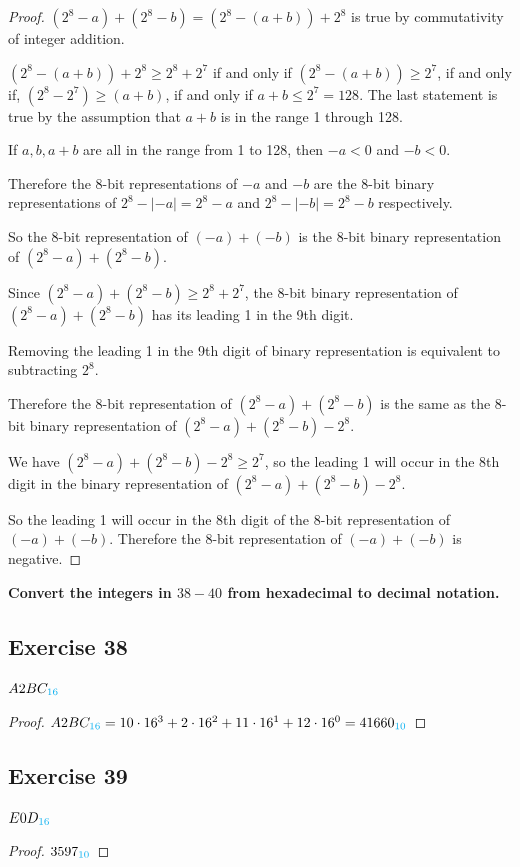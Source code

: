 \documentclass[14pt]{extarticle}
\newcommand{\base}[1]{{\color{cyan}#1}} \newcommand{\da}{\downarrow}
\begin{document}
\begin{proof} $(2^8 - a) + (2^8 - b) = (2^8 - (a + b)) + 2^8$ is true by
commutativity of integer addition.

$(2^8 - (a + b)) + 2^8 \geq 2^8 + 2^7$ if and only if $(2^8 - (a + b)) \geq
2^7$, if and only if, $(2^8 - 2^7) \geq (a + b)$, if and only if $a + b \leq 2^7
= 128$. The last statement is true by the assumption that $a+b$ is in the range
1 through 128.

If $a, b, a+b$ are all in the range from 1 to 128, then $-a < 0$ and $-b < 0$. 

Therefore the 8-bit representations of $-a$ and $-b$ are the 8-bit binary
representations of $2^8 - |-a| = 2^8 - a$ and $2^8 - |-b| = 2^8 - b$
respectively.

So the 8-bit representation of $(-a) + (-b)$ is the 8-bit binary representation
of $(2^8 - a) + (2^8 - b)$.

Since $(2^8 - a) + (2^8 - b) \geq 2^8 + 2^7$, the 8-bit binary representation of
$(2^8 - a) + (2^8 - b)$ has its leading 1 in the 9th digit.

Removing the leading 1 in the 9th digit of binary representation is equivalent
to subtracting $2^8$.

Therefore the 8-bit representation of $(2^8 - a) + (2^8 - b)$ is the same as the
8-bit binary representation of $(2^8 - a) + (2^8 - b) - 2^8$.

We have $(2^8 - a) + (2^8 - b) - 2^8 \geq 2^7$, so the leading 1 will occur in
the 8th digit in the binary representation of $(2^8 - a) + (2^8 - b) - 2^8$.

So the leading 1 will occur in the 8th digit of the 8-bit representation of
$(-a) + (-b)$. Therefore the 8-bit representation of $(-a) + (-b)$ is negative.
\end{proof}

{\bf \color{cyan} Convert the integers in $38-40$ from hexadecimal to decimal
notation.}

\subsection{Exercise 38} $A2BC_\base{16}$
\begin{proof} $A2BC_\base{16} = 10 \cdot 16^3 + 2 \cdot 16^2 + 11 \cdot 16^1 +
12 \cdot 16^0 = 41660_\base{10}$ \end{proof}

\subsection{Exercise 39} $E0D_\base{16}$
\begin{proof} $3597_\base{10}$ \end{proof}
\end{document}
